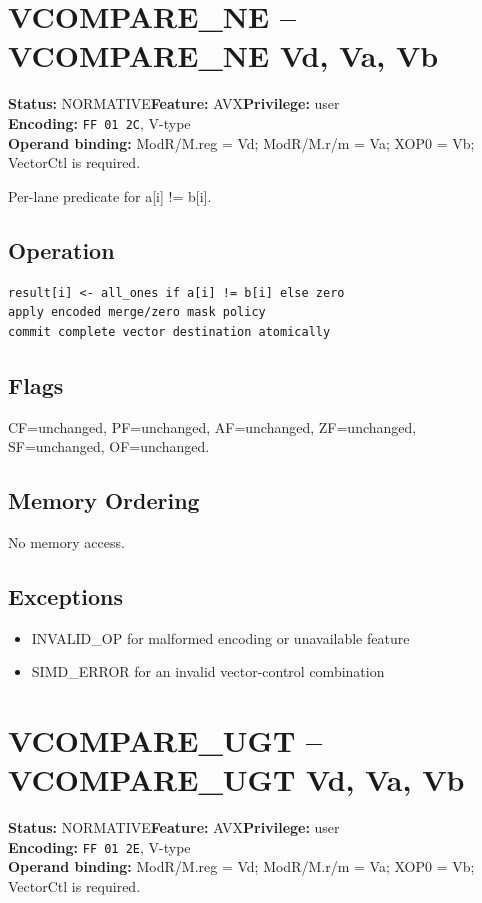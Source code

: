 \documentclass[10pt]{article}
\begin{document}
\section{VCOMPARE\_NE -- VCOMPARE\_NE Vd, Va, Vb}
\textbf{Status:} NORMATIVE\quad \textbf{Feature:} AVX\quad \textbf{Privilege:} user\\
\textbf{Encoding:} \texttt{FF 01 2C}, V-type\\
\textbf{Operand binding:} ModR/M.reg = Vd; ModR/M.r/m = Va; XOP0 = Vb; VectorCtl is required.

Per-lane predicate for a[i] != b[i].

\subsection*{Operation}
\begin{lstlisting}
result[i] <- all_ones if a[i] != b[i] else zero
apply encoded merge/zero mask policy
commit complete vector destination atomically
\end{lstlisting}
\subsection*{Flags}
CF=unchanged, PF=unchanged, AF=unchanged, ZF=unchanged, SF=unchanged, OF=unchanged.
\subsection*{Memory Ordering}
No memory access.
\subsection*{Exceptions}
\begin{itemize}
\item INVALID\_OP for malformed encoding or unavailable feature
\item SIMD\_ERROR for an invalid vector-control combination
\end{itemize}
\clearpage

\section{VCOMPARE\_UGT -- VCOMPARE\_UGT Vd, Va, Vb}
\textbf{Status:} NORMATIVE\quad \textbf{Feature:} AVX\quad \textbf{Privilege:} user\\
\textbf{Encoding:} \texttt{FF 01 2E}, V-type\\
\textbf{Operand binding:} ModR/M.reg = Vd; ModR/M.r/m = Va; XOP0 = Vb; VectorCtl is required.
\end{document}
